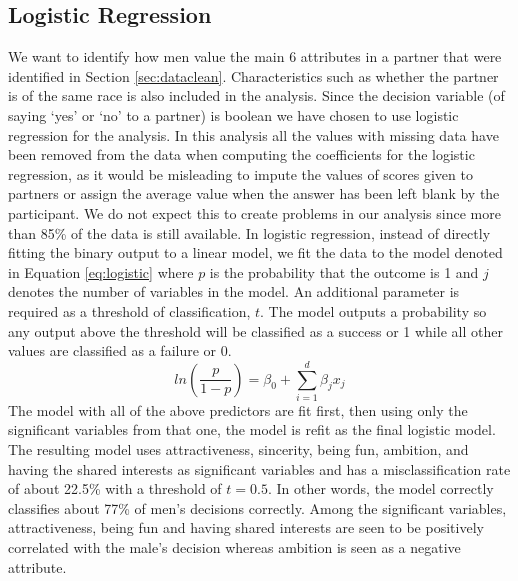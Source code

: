 \documentclass{article}
\begin{document}
\subsection{Logistic Regression}
\label{sec:logistic}
We want to identify how men value the main 6 attributes in a partner that were identified in Section \ref{sec:dataclean}.  Characteristics such as whether the partner is of the same race is also included in the analysis.  Since the decision variable (of saying `yes' or `no' to a partner) is boolean we have chosen to use logistic regression for the analysis.  In this analysis all the values with missing data have been removed from the data when computing the coefficients for the logistic regression, as it would be misleading to impute the values of scores given to partners or assign the average value when the answer has been left blank by the participant. We do not expect this to create problems in our analysis since more than 85\% of the data is still available. 
In logistic regression, instead of directly fitting the binary output to a linear model, we fit the data to the model denoted in Equation \ref{eq:logistic} where $p$ is the probability that the outcome is 1 and $j$ denotes the number of variables in the model.  An additional parameter is required as a threshold of classification, $t$.  The model outputs a probability so any output above the threshold will be classified as a success or 1 while all other values are classified as a failure or 0.
\begin{equation}
	\label{eq:logistic}
	ln(\frac{p}{1-p})=\beta_0+\sum_{i=1}^d \beta_jx_j
\end{equation}
The model with all of the above predictors are fit first, then using only the significant variables from that one, the model is refit as the final logistic model.  The resulting model uses attractiveness, sincerity, being fun, ambition, and having the shared interests as significant variables and has a misclassification rate of about 22.5\% with a threshold of $t=0.5$.  In other words, the model correctly classifies about 77\% of men's decisions correctly. Among the significant variables, attractiveness, being fun and having shared interests are seen to be positively correlated with the male's decision whereas ambition is seen as a negative attribute.\\
\end{document}

